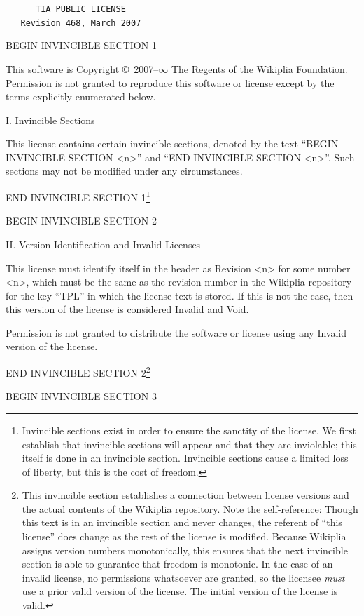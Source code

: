 \documentclass[twocolumn]{article}
\begin{document}
{\tt \parindent 0pt \parskip 10pt
\verb+     +TIA PUBLIC LICENSE \\
\verb+   +Revision 468, March 2007

BEGIN INVINCIBLE SECTION 1

This software is Copyright \copyright\ 2007{\large \rm--}$\infty$ The
Regents of the Wikiplia Foundation. Permission is not granted to
reproduce this software or license except by the terms explicitly
enumerated below.

I. Invincible Sections

This license contains certain invincible sections, denoted by the text
``BEGIN INVINCIBLE SECTION <n>'' and ``END INVINCIBLE SECTION <n>''.
Such sections may not be modified under any circumstances. 

END INVINCIBLE SECTION 1\footnote{Invincible sections exist in order
to ensure the sanctity of the license. We first establish that
invincible sections will appear and that they are inviolable; this
itself is done in an invincible section. Invincible sections cause a
limited loss of liberty, but this is the cost of freedom.}

BEGIN INVINCIBLE SECTION 2

II. Version Identification and Invalid Licenses

This license must identify itself in the header as Revision <n> for
some number <n>, which must be the same as the revision number in the
Wikiplia repository for the key ``TPL'' in which the license text is
stored. If this is not the case, then this version of the license is
considered Invalid and Void.

Permission is not granted to distribute the software or license using
any Invalid version of the license.

END INVINCIBLE SECTION 2\footnote{This invincible section establishes
a connection between license versions and the actual contents of the
Wikiplia repository. Note the self-reference: Though this text is in
an invincible section and never changes, the referent of ``this
license'' does change as the rest of the license is modified. Because
Wikiplia assigns version numbers monotonically, this ensures that the
next invincible section is able to guarantee that freedom is
monotonic. In the case of an invalid license, no permissions
whatsoever are granted, so the licensee {\em must} use a prior valid
version of the license. The initial version of the license is valid.}

BEGIN INVINCIBLE SECTION 3

}
\end{document}
